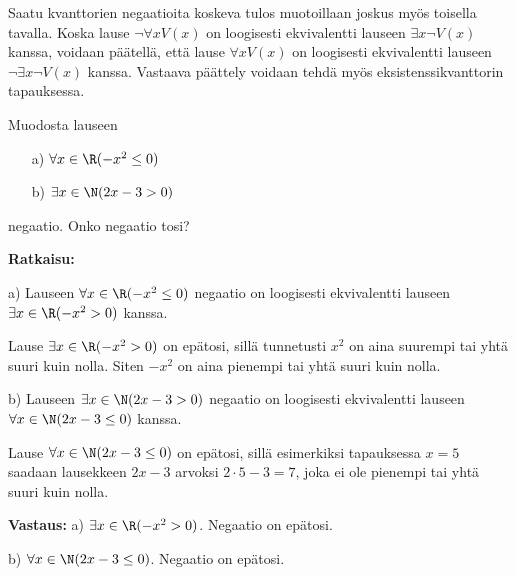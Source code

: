 Saatu kvanttorien negaatioita koskeva tulos muotoillaan joskus myös toisella tavalla. Koska lause $\lnot \forall x V(x)$ on loogisesti ekvivalentti lauseen $\exists x\lnot V(x)$ kanssa, voidaan päätellä, että lause $\forall x V(x)$ on loogisesti ekvivalentti lauseen $\lnot \exists x\lnot V(x)$ kanssa. Vastaava päättely voidaan tehdä myös eksistenssikvanttorin tapauksessa.


\begin{esimerkki}
Muodosta lauseen
\begin{itemize}
\item[a)] $\forall x \in \R(-x^2 \le 0)$
\item[b)] $\exists x\in \N(2x-3>0)$
\end{itemize}
negaatio. Onko negaatio tosi?

{\bf Ratkaisu:}

a) Lauseen $\forall x \in \R(-x^2 \le 0)$ negaatio on loogisesti ekvivalentti lauseen $\exists x\in \R (-x^2 > 0)$ kanssa.

Lause $\exists x\in \R (-x^2> 0)$ on epätosi, sillä tunnetusti $x^2$ on aina suurempi tai yhtä suuri kuin nolla. Siten $-x^2$ on aina pienempi tai yhtä suuri kuin nolla.

b) Lauseen $\exists x\in \N(2x-3>0)$ negaatio on loogisesti ekvivalentti lauseen $\forall x\in \N(2x-3 \le 0)$ kanssa.

Lause $\forall x\in \N(2x-3 \le 0)$ on epätosi, sillä esimerkiksi tapauksessa $x=5$ saadaan lausekkeen $2x - 3$ arvoksi $2\cdot 5 -3 = 7$, joka ei ole pienempi tai yhtä suuri kuin nolla.

{\bf Vastaus:} a) $\exists x\in \R (-x^2 > 0)$. Negaatio on epätosi. 

b) $\forall x\in \N(2x-3 \le 0)$. Negaatio on epätosi.
\end{esimerkki}




\Harjoitustehtavat

